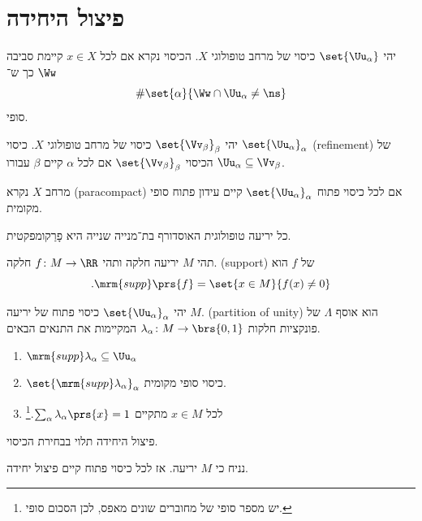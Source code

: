 \documentclass[a4paper,10pt,twoside,openany]{book}
\begin{document}
\chapter{פיצול היחידה}
\begin{definition}
יהי
$\set{\Uu_{\alpha}}$
כיסוי של מרחב טופולוגי
$X$.
הכיסוי נקרא
אם לכל
$x \in X$
קיימת סביבה
$\Ww$
כך ש־%
\[\#\set{\alpha}{\Ww \cap \Uu_{\alpha} \neq \ns}\]
סופי.
\end{definition}
\begin{definition}
יהי
$\set{\Vv_{\beta}}_{\beta}$
כיסוי של מרחב טופולוגי
$X$.
כיסוי
$\set{\Uu_{\alpha}}_{\alpha}$
\textenglish{(refinement)}
של הכיסוי
$\set{\Vv_{\beta}}_{\beta}$
אם לכל
$\alpha$
קיים
$\beta$
עבורו
$\Uu_{\alpha} \subseteq \Vv_{\beta}$.
\end{definition}
\begin{definition}
מרחב
$X$
נקרא
 \textenglish{(paracompact)}
אם לכל כיסוי פתוח
$\set{\Uu_{\alpha}}_{\alpha}$
קיים עידון פתוח סופי מקומית.
\end{definition}
\begin{theorem}
כל יריעה טופולוגית האוסדורף בת־מנייה שנייה היא פָרַקומפקטית.
\end{theorem}
\begin{definition}
תהי
$M$
יריעה חלקה ותהי
$f \colon M \to \RR$
חלקה.
 \textenglish{(support)}
של
$f$
הוא
\[\text{.} \mrm{supp}\prs{f} = \set{x\in M}{f(x) \neq 0}\]
\end{definition}
\begin{definition}
יהי
$\set{\Uu_{\alpha}}_{\alpha}$
כיסוי פתוח של יריעה
$M$.
 \textenglish{(partition of unity)}
הוא אוסף
$\Lambda$
של פונקציות חלקות
$\lambda_{\alpha} \colon M \to \brs{0,1}$
המקיימות את התנאים הבאים.
\begin{enumerate}
\item $\mrm{supp} \lambda_{\alpha} \subseteq \Uu_{\alpha}$
\item $\set{\mrm{supp} \lambda_{\alpha}}_{\alpha}$
כיסוי סופי מקומית.
\item לכל
$x \in M$
מתקיים
$\sum_{\alpha} \lambda_{\alpha}\prs{x} = 1$.\footnote{יש מספר סופי של מחוברים שונים מאפס, לכן הסכום סופי.}
\end{enumerate}
\end{definition}
\begin{remark}
פיצול היחידה תלוי בבחירת הכיסוי.
\end{remark}
\begin{theorem}
נניח כי
$M$
יריעה.
אז לכל כיסוי פתוח קיים פיצול יחידה.
\end{theorem}
\end{document}
